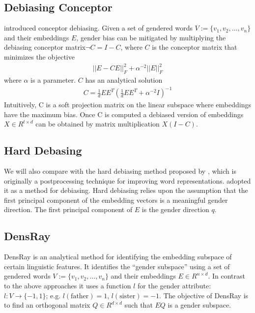 
\subsection{Debiasing Conceptor}
 introduced conceptor debiasing. Given a set of gendered words $V:=\{v_1,v_2,\dots,v_n\}$ and their embeddings $E$, gender bias can be mitigated by multiplying the debiasing conceptor matrix$\neg C= I-C$, where $C$ is the conceptor matrix that minimizes the objective
\begin{eqnarray}
||E-CE||^2_F+\alpha^{-2}||E||^2_F
\end{eqnarray}
where $\alpha$ is a parameter. $C$ has an analytical solution
\begin{eqnarray}
C=\frac{1}{d}EE^{T}(\frac{1}{d}EE^{T}+\alpha^{-2}I)^{-1}
\end{eqnarray}
Intuitively, C is a soft projection matrix on the linear subspace where embeddings have the maximum bias. 
Once C is computed a debiased version of embeddings $X \in R^{t \times d}$  can be obtained by matrix multiplication $X(I-C)$.

\subsection{Hard Debasing}
We will also compare with the hard debiasing method proposed
by , which is originally a postprocessing
technique for improving word
representations.  adopted it as a
method for debiasing. Hard debiasing relies upon
the assumption that the first principal component of the
embedding vectors is a meaningful gender direction. The first principal component of $E$ is the gender direction $q$.

\subsection{DensRay}
DensRay \cite{dufter2019analytical} is an analytical method for identifying the
embedding subspace of certain linguistic features. It
identifies the ``gender subspace'' using a set of gendered words
$V:=\{v_1,v_2,\dots,v_n\}$ and their embeddings $E \in
R^{n\times d}$. In contrast to the above approaches it uses a function $l$ for the gender attribute:
$l:V\to \{-1,1\}$;
e.g. $l(\mbox{father})=1$, $l(\mbox{sister})=-1$. The objective of DensRay
is to find an orthogonal matrix $Q\in R^{d\times d}$ such
that $EQ$ is  a gender subspace.

